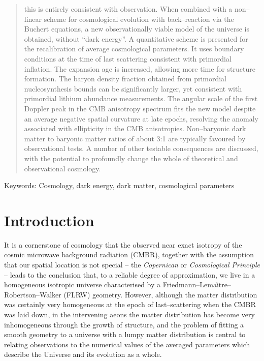\documentclass[12pt]{article}
\begin{document}
\begin{abstract}
this is entirely consistent with observation. When combined with a non--linear
scheme for cosmological evolution with back--reaction via the
Buchert equations, a new observationally viable model of the universe
is obtained, without ``dark energy''. A quantitative scheme is presented for
the recalibration of average cosmological parameters. It uses boundary
conditions at the time of last scattering consistent with primordial
inflation. The expansion age is increased, allowing more time for structure
formation. The baryon density fraction obtained from primordial
nucleosynthesis bounds can be significantly larger, yet consistent with
primordial lithium abundance measurements. The angular scale of the first
Doppler peak in the CMB anisotropy spectrum fits the new model despite an
average negative spatial curvature at late epochs, resolving the anomaly
associated with ellipticity in the CMB anisotropies. Non--baryonic dark
matter to baryonic matter ratios of about 3:1 are typically favoured by
observational tests. A number of
other testable consequences are discussed, with the potential to profoundly
change the whole of theoretical and observational cosmology.
\end{abstract}
Keywords: Cosmology, dark energy, dark matter, cosmological parameters
\maketitle

\section{Introduction}

It is a cornerstone of cosmology that the observed near exact
isotropy of the cosmic microwave background radiation (CMBR),
together with the assumption that our spatial location is not
special -- the {\em Copernican} or {\em Cosmological Principle} --
leads to the conclusion that, to a reliable degree of approximation,
we live in a homogeneous isotropic universe characterised by a
Friedmann--Lema\^{\i}tre--Robertson--Walker (FLRW) geometry.
However, although the matter distribution was certainly very
homogeneous at the epoch of last--scattering when the CMBR was
laid down, in the intervening aeons the matter distribution has become
very inhomogeneous through the growth of structure, and the problem of
fitting a smooth geometry to a universe with a lumpy matter distribution
\cite{fit1,fit2} is central to relating observations to the numerical values
of the averaged parameters which describe the Universe and its evolution
as a whole.
\end{document}
